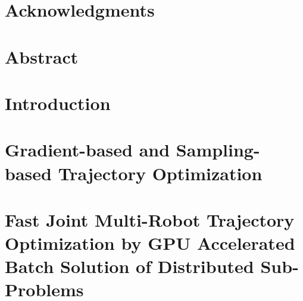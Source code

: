 \documentclass[11pt]{book}
\renewcommand{\baselinestretch}{1.2}
\begin{document}



\newpage
\thispagestyle{empty}
\renewcommand{\thesisdedication}{{\large Copyright \copyright~~Dipanwita Guhathakurta, 2023\\}{\large All Rights Reserved\\}}
\thesisdedicationpage



\newpage
\thispagestyle{empty}
\renewcommand{\thesisdedication}{One Small Step for Robot, One Giant Leap for Mankind}{\large }
\thesisdedicationpage

\mastersthesis
\renewcommand{\baselinestretch}{1.5}

\chapter*{Acknowledgments}
\label{ch:ack}


\chapter*{Abstract}
\label{ch:abstract}


\tableofcontents
\listoffigures
\listoftables


\chapter{Introduction}
\label{ch:intro}



\chapter{Gradient-based and Sampling-based Trajectory Optimization}
\label{ch:background}



\chapter{Fast Joint Multi-Robot Trajectory Optimization by GPU Accelerated Batch Solution of Distributed Sub-Problems}
\label{ch:gpu_mat}

\end{document}
